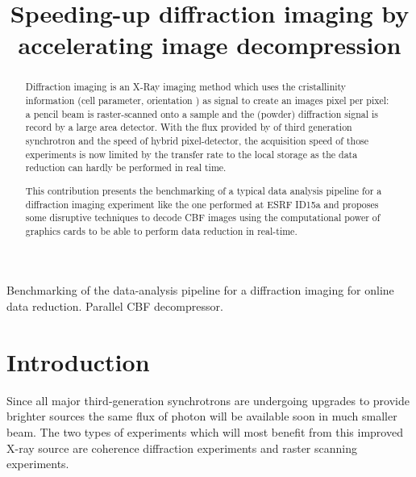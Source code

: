 \documentclass[preprint, pdf]{iucr}              %
\begin{document}

\title{Speeding-up diffraction imaging by accelerating image decompression}

 





\maketitle                        %

\begin{synopsis}
Benchmarking of the data-analysis pipeline for a diffraction imaging for online
data reduction. Parallel CBF decompressor.
\end{synopsis}

\begin{abstract}

Diffraction imaging is an X-Ray imaging method which uses the cristallinity
information (cell parameter, orientation ) as signal to create an images pixel
per pixel:
a pencil beam is raster-scanned onto a sample and the (powder) diffraction
signal is record by a large area detector. 
With the flux provided by of third generation synchrotron and the speed of
hybrid pixel-detector, the acquisition speed of those experiments is now 
limited by the transfer rate to the local storage as the data reduction can
hardly be performed in real time.

This contribution presents the benchmarking of a typical data
analysis pipeline for a diffraction imaging experiment like the one performed at
ESRF ID15a and proposes some disruptive techniques to decode CBF images using the
computational power of graphics cards to be able to perform data reduction in
real-time.
\end{abstract}


\section{Introduction}

Since all major third-generation synchrotrons are undergoing upgrades
to provide brighter sources \cite{ESRF-EBS, APS-U, S8U} the same
flux of photon will be available soon in much smaller beam. 
The two types of experiments which will most benefit from this improved
X-ray source are coherence diffraction experiments and raster scanning
experiments.
\end{document}
